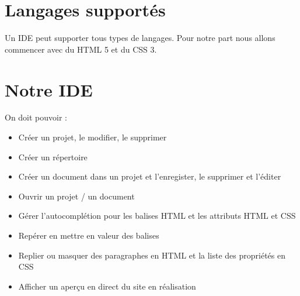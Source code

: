 \documentclass[a4paper,12pt]{article} %
\begin{document}
\section{Langages supportés}
	Un IDE peut supporter tous types de langages. Pour notre part nous allons commencer avec du HTML 5 et du CSS 3.
	
\section{Notre IDE}
	On doit pouvoir :
	\begin{itemize}
		\item Créer un projet, le modifier, le supprimer
		\item Créer un répertoire
		\item Créer un document dans un projet et l'enregister, le supprimer et l'éditer
		\item Ouvrir un projet / un document
		\item Gérer l'autocomplétion pour les balises HTML et les attributs HTML et CSS
		\item Repérer en mettre en valeur des balises
		\item Replier ou masquer des paragraphes en HTML et la liste des propriétés en CSS
		\item Afficher un aperçu en direct du site en réalisation
	\end{itemize}
\end{document}
